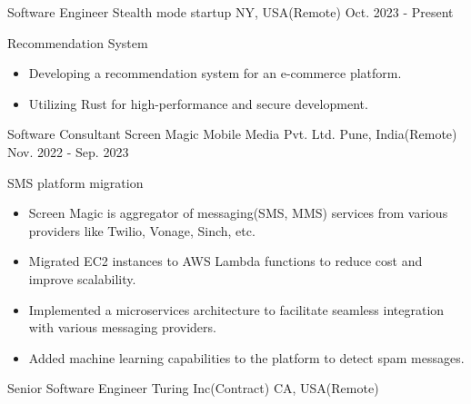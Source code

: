 

\begin{cventries}

  \cventry
  {Software Engineer} %
  {Stealth mode startup} %
  {NY, USA(Remote)} %
  {Oct. 2023 - Present} %
  {
    \begin{cvitems} %
      \item {Recommendation System}
      \begin {itemize}
        \item Developing a recommendation system for an e-commerce platform.
        \item Utilizing Rust for high-performance and secure development.
      \end{itemize}
    \end{cvitems}
  }
  \cventry
  {Software Consultant} %
  {Screen Magic Mobile Media Pvt. Ltd.} %
  {Pune, India(Remote)} %
  {Nov. 2022 - Sep. 2023} %
  {
    \begin{cvitems} %
      \item {SMS platform migration}
      \begin {itemize}
        \item Screen Magic is aggregator of messaging(SMS, MMS) services from various providers like Twilio, Vonage, Sinch, etc.
        \item Migrated EC2 instances to AWS Lambda functions to reduce cost and improve scalability.
        \item Implemented a microservices architecture to facilitate seamless integration with various messaging providers.
        \item Added machine learning capabilities to the platform to detect spam messages.
      \end{itemize}
    \end{cvitems}
  }
  \cventry
    {Senior Software Engineer} %
    {Turing Inc(Contract)} %
    {CA, USA(Remote)} %

\end{cventries}
